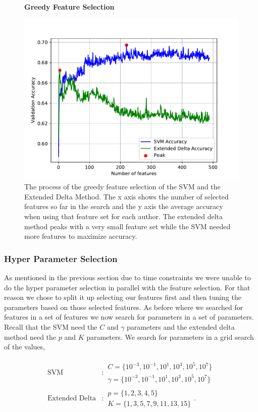 \begin{figure}
    \centering
    \textbf{Greedy Feature Selection}\par\medskip
    \includegraphics[scale=0.6]{./pictures/experiments/feature_selection}
    \caption{The process of the greedy feature selection of the SVM and the
        Extended Delta Method. The x axis shows the number of selected features
        so far in the search and the y axis the average accuracy when using that
        feature set for each author. The extended delta method peaks with a very
        small feature set while the \gls{SVM} needed more features to maximize
        accuracy.
    }
    \label{fig:fs_results}
\end{figure}


\subsubsection{Hyper Parameter Selection}\label{sec:hyp_select}

As mentioned in the previous section due to time constraints we were unable
to do the hyper parameter selection in parallel with the feature selection.
For that reason we chose to split it up selecting our features first and then
tuning the parameters based on those selected features. As before where we
searched for features in a set of features we now search for parameters in a set
of parameters. Recall that the \gls{SVM} need the $C$ and $\gamma$ parameters
and the extended delta method need the $p$ and $K$ parameters. We search for
parameters in a grid search of the values,

\begin{align}
    \text{SVM} &:
    \begin{array}{lr}
        C=\{10^{-3}, 10^{-1}, 10^{1}, 10^{3}, 10^{5}, 10^7\}\\
        \gamma=\{10^{-3}, 10^{-1}, 10^{1}, 10^{3}, 10^{5}, 10^7\}
    \end{array} \\
    \text{Extended Delta} &:
    \begin{array}{lr}
        p=\{1,2,3,4,5\}\\
        K=\{1,3,5,7,9,11,13,15\}
    \end{array}.
\end{align}

